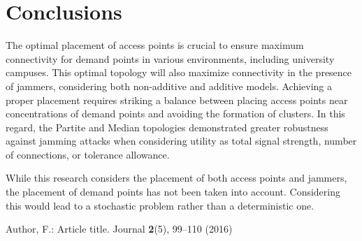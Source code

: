 \documentclass[runningheads]{llncs}
\begin{document}
	
	\section{Conclusions}
	
	The optimal placement of access points is crucial to ensure maximum connectivity for demand points in various environments, including university campuses. This optimal topology will also maximize connectivity in the presence of jammers, considering both non-additive and additive models.
	Achieving a proper placement requires striking a balance between placing access points near concentrations of demand points and avoiding the formation of clusters.	In this regard, the Partite and Median topologies demonstrated greater robustness against jamming attacks when considering utility as total signal strength, number of connections, or tolerance allowance.
	
	While this research considers the placement of both access points and jammers, the placement of demand points has not been taken into account. Considering this would lead to a stochastic problem rather than a deterministic one.
	
 

	\begin{thebibliography}{8}
		Author, F.: Article title. Journal \textbf{2}(5), 99--110 (2016)
		
	\end{thebibliography}
\end{document}
